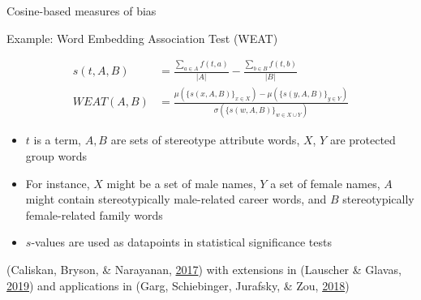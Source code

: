 \documentclass[10pt,ignorenonframetext,x11names, dvipsnames, bibspacing,natbib]{beamer}
\begin{document}
\begin{frame}{Cosine-based measures of bias}

\begin{block}{Example: Word Embedding Association Test (WEAT)}

\begin{align*}
s(t,A,B) & = \frac{\sum_{a\in A}f(t,a)}{\vert A\vert} - \frac{\sum_{b\in B}f(t,b)}{\vert B\vert}
\\
WEAT(A,B) & = \frac{
\mu\left(\{s(x,A,B)\}_{x\in X}\right) -\mu\left(\{s(y,A,B)\}_{y\in Y}\right) 
}{
\sigma\left(\{s(w,A,B)\}_{w\in X\cup Y}\right)
}
\end{align*}

\begin{itemize}
\item
  \(t\) is a term, \(A, B\) are sets of stereotype attribute words,
  \(X\), \(Y\) are protected group words
\item
  For instance, \(X\) might be a set of male names, \(Y\) a set of
  female names, \(A\) might contain stereotypically male-related career
  words, and \(B\) stereotypically female-related family words
\item
  \(s\)-values are used as datapoints in statistical significance tests
\end{itemize}

\footnotesize

(Caliskan, Bryson, \& Narayanan,
\protect\hyperlink{ref-Caliskan2017semanticsBiases}{2017}) with
extensions in (Lauscher \& Glavas,
\protect\hyperlink{ref-Lauscher2019multidimensional}{2019}) and
applications in (Garg, Schiebinger, Jurafsky, \& Zou,
\protect\hyperlink{ref-Garg2018years}{2018})

\end{block}

\end{frame}
\end{document}
